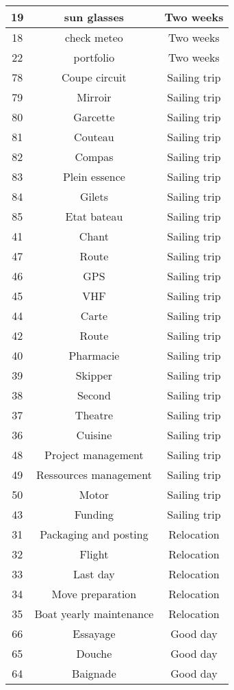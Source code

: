 \begin{longtable}{|c|c|c|}
19 & sun glasses & Two weeks\\
\hline
18 & check meteo & Two weeks\\
\hline
22 & portfolio & Two weeks\\
\hline
78 & Coupe circuit & Sailing trip\\
\hline
79 & Mirroir & Sailing trip\\
\hline
80 & Garcette & Sailing trip\\
\hline
81 & Couteau  & Sailing trip\\
\hline
82 & Compas & Sailing trip\\
\hline
83 & Plein essence & Sailing trip\\
\hline
84 & Gilets & Sailing trip\\
\hline
85 & Etat bateau & Sailing trip\\
\hline
41 & Chant & Sailing trip\\
\hline
47 & Route & Sailing trip\\
\hline
46 & GPS & Sailing trip\\
\hline
45 & VHF & Sailing trip\\
\hline
44 & Carte & Sailing trip\\
\hline
42 & Route & Sailing trip\\
\hline
40 & Pharmacie & Sailing trip\\
\hline
39 & Skipper & Sailing trip\\
\hline
38 & Second & Sailing trip\\
\hline
37 & Theatre & Sailing trip\\
\hline
36 & Cuisine & Sailing trip\\
\hline
48 & Project management & Sailing trip\\
\hline
49 & Ressources management & Sailing trip\\
\hline
50 & Motor & Sailing trip\\
\hline
43 & Funding & Sailing trip\\
\hline
31 & Packaging and posting & Relocation\\
\hline
32 & Flight & Relocation\\
\hline
33 & Last day & Relocation\\
\hline
34 & Move preparation & Relocation\\
\hline
35 & Boat yearly maintenance & Relocation\\
\hline
66 & Essayage & Good day\\
\hline
65 & Douche & Good day\\
\hline
64 & Baignade & Good day\\

\end{longtable}

